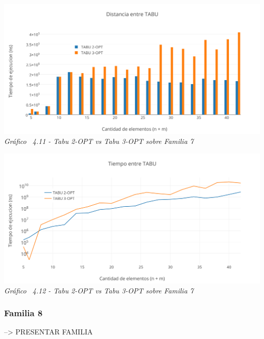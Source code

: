 \vspace*{0.3cm} \vspace*{0.3cm}
  \begin{center}
 \includegraphics[scale=0.5]{./EJ4/comparativoanillos1.png}\\
 {            \textit{Gráfico \ 4.11 - Tabu 2-OPT vs Tabu 3-OPT sobre Familia 7}}
  \end{center}
  \vspace*{0.3cm}

\vspace*{0.3cm} \vspace*{0.3cm}
  \begin{center}
 \includegraphics[scale=0.5]{./EJ4/comparativoanillos.png}\\
 {            \textit{Gráfico \ 4.12 - Tabu 2-OPT vs Tabu 3-OPT sobre Familia 7}}
  \end{center}
  \vspace*{0.3cm}

\subsubsection*{Familia 8}

--> PRESENTAR FAMILIA

